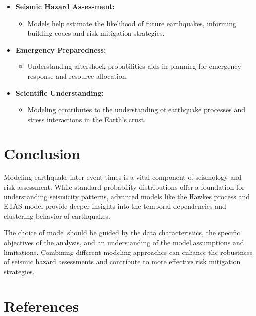 \documentclass{article}
\begin{document}
\begin{itemize}
    \item \textbf{Seismic Hazard Assessment:}

    \begin{itemize}
        \item Models help estimate the likelihood of future earthquakes, informing building codes and risk mitigation strategies.
    \end{itemize}

    \item \textbf{Emergency Preparedness:}

    \begin{itemize}
        \item Understanding aftershock probabilities aids in planning for emergency response and resource allocation.
    \end{itemize}

    \item \textbf{Scientific Understanding:}

    \begin{itemize}
        \item Modeling contributes to the understanding of earthquake processes and stress interactions in the Earth's crust.
    \end{itemize}
\end{itemize}

\section{Conclusion}

Modeling earthquake inter-event times is a vital component of seismology and risk assessment. While standard probability distributions offer a foundation for understanding seismicity patterns, advanced models like the Hawkes process and ETAS model provide deeper insights into the temporal dependencies and clustering behavior of earthquakes.

The choice of model should be guided by the data characteristics, the specific objectives of the analysis, and an understanding of the model assumptions and limitations. Combining different modeling approaches can enhance the robustness of seismic hazard assessments and contribute to more effective risk mitigation strategies.

\section{References}
\end{document}

